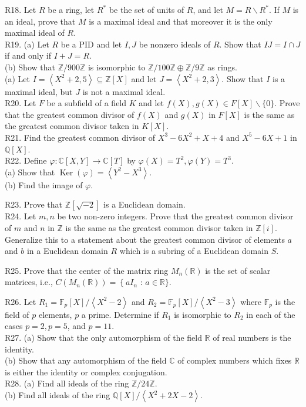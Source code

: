 R18. Let $R$ be a ring, let $R^{*}$ be the set of units of $R$, and let $M=R \backslash R^{*}$. If $M$ is an ideal, prove that $M$ is a maximal ideal and that moreover it is the only maximal ideal of $R$.\\
R19. (a) Let $R$ be a PID and let $I, J$ be nonzero ideals of $R$. Show that $I J=I \cap J$ if and only if $I+J=R$.\\
(b) Show that $\mathbb{Z} / 900 \mathbb{Z}$ is isomorphic to $\mathbb{Z} / 100 \mathbb{Z} \oplus \mathbb{Z} / 9 \mathbb{Z}$ as rings.\\
(a) Let $I=\left\langle X^{2}+2,5\right\rangle \subseteq \mathbb{Z}[X]$ and let $J=\left\langle X^{2}+2,3\right\rangle$. Show that $I$ is a maximal ideal, but $J$ is not a maximal ideal.\\
R20. Let $F$ be a subfield of a field $K$ and let $f(X), g(X) \in F[X] \backslash\{0\}$. Prove that the greatest common divisor of $f(X)$ and $g(X)$ in $F[X]$ is the same as the greatest common divisor taken in $K[X]$.\\
R21. Find the greatest common divisor of $X^{3}-6 X^{2}+X+4$ and $X^{5}-6 X+1$ in $\mathbb{Q}[X]$.\\
R22. Define $\varphi: \mathbb{C}[X, Y] \rightarrow \mathbb{C}[T]$ by $\varphi(X)=T^{2}, \varphi(Y)=T^{3}$.\\
(a) Show that $\operatorname{Ker}(\varphi)=\left\langle Y^{2}-X^{3}\right\rangle$.\\
(b) Find the image of $\varphi$.

R23. Prove that $\mathbb{Z}[\sqrt{-2}]$ is a Euclidean domain.\\
R24. Let $m, n$ be two non-zero integers. Prove that the greatest common divisor of $m$ and $n$ in $\mathbb{Z}$ is the same as the greatest common divisor taken in $\mathbb{Z}[i]$. Generalize this to a statement about the greatest common divisor of elements $a$ and $b$ in a Euclidean domain $R$ which is a subring of a Euclidean domain $S$.

R25. Prove that the center of the matrix ring $M_{n}(\mathbb{R})$ is the set of scalar matrices, i.e., $C\left(M_{n}(\mathbb{R})\right)=\left\{a I_{n}\right.$ : $a \in \mathbb{R}\}$.

R26. Let $R_{1}=\mathbb{F}_{p}[X] /\left\langle X^{2}-2\right\rangle$ and $R_{2}=\mathbb{F}_{p}[X] /\left\langle X^{2}-3\right\rangle$ where $\mathbb{F}_{p}$ is the field of $p$ elements, $p$ a prime. Determine if $R_{1}$ is isomorphic to $R_{2}$ in each of the cases $p=2, p=5$, and $p=11$.\\
R27. (a) Show that the only automorphism of the field $\mathbb{R}$ of real numbers is the identity.\\
(b) Show that any automorphism of the field $\mathbb{C}$ of complex numbers which fixes $\mathbb{R}$ is either the identity or complex conjugation.\\
R28. (a) Find all ideals of the ring $\mathbb{Z} / 24 \mathbb{Z}$.\\
(b) Find all ideals of the ring $\mathbb{Q}[X] /\left\langle X^{2}+2 X-2\right\rangle$.

